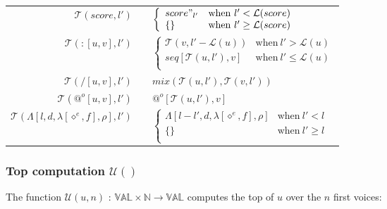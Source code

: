 \documentclass[10pt,a4paper,frenchb]{article}
\makeatletter
\newcommand{\seq}{:}
\newcommand{\var}[1]{\diamond^#1}
\newcommand{\es}{\{\}}
\newcommand{\val}{\mathbb{VAL}}
\newcommand{\closure}{\Lambda}
\newcommand{\noredex}{@^o}
\newcommand{\f}[3]{$#1 \times #2 \rightarrow #3$}
\newcommand{\envsym}{\rho}
\newcommand{\closenv}[4][\var{e}]{\closure[#3,#4,\lambda[#1,#2],\envsym]}
\newcommand{\length}	{{\mathcal L}}
\newcommand{\tail}		{{\mathcal T}}
\renewcommand{\top}	{{\mathcal U}}
\makeatother
\begin{document}
\begin{center}
\begin{tabular*}{12cm}{rc@{ $\rightarrow$ }l}
 \hline
 $\tail(score,l')$				& & $\left\{ \begin{array}{ll}
 								score"_{l'} & \mathrm{when} \  l' < \length(score) \\
								\es & \mathrm{when} \  l' \geq \length(score) \\
	 							\end{array} \right.$ \\
 $\tail(\seq [u,v],l')$		& & $\left\{ \begin{array}{ll}
 								\tail(v,l'-\length(u)) & \mathrm{when} \  l' > \length(u) \\
								seq[\tail(u, l'),v] & \mathrm{when} \  l' \leq \length(u) \\
	 							\end{array} \right.$ \\
 $\tail(/ [u,v],l')$ 			& & $mix(\tail(u, l'), \tail(v, l'))$ \\
 $\tail(\noredex [u,v],l')$ 	& & $\noredex[\tail(u,l'),v]$ \\
 $\tail(\closenv{f}{l}{d},l')$ 	& &  $\left\{ \begin{array}{ll}
 								\closenv{f}{l-l'}{d} & \mathrm{when} \  l' < l \\
								\es & \mathrm{when} \  l' \geq l \\
	 							\end{array} \right.$ \\
 \hline
\end{tabular*}
\end{center}

\subsubsection{Top computation $\top()$}
The function $\top(u,n)$ :  \f{\val}{\mathbb{N}}{\val} computes the top of $u$ over the $n$ first voices:
\end{document}

